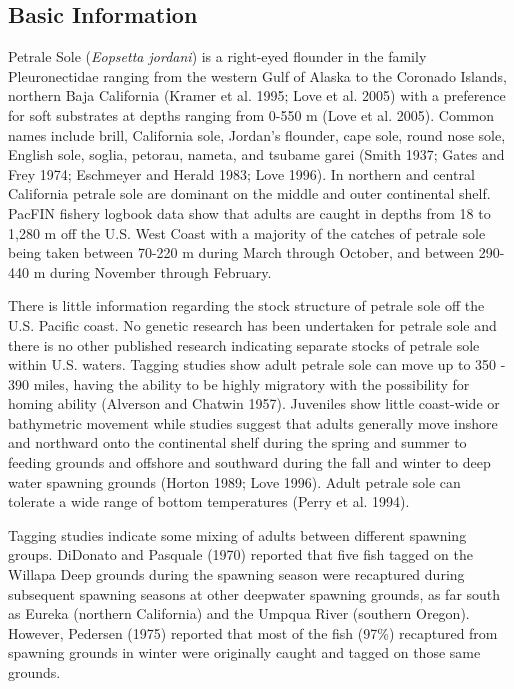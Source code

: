 \documentclass[11pt,
  english,
  letterpaper,
]{article}
\begin{document}
\hypertarget{basic-information}{%
\subsection{Basic Information}\label{basic-information}}

Petrale Sole (\emph{Eopsetta jordani}) is a right-eyed flounder in the family Pleuronectidae ranging from the western Gulf of Alaska to the Coronado Islands, northern Baja California (Kramer et al. 1995; Love et al. 2005) with a preference for soft substrates at depths ranging from 0-550 m (Love et al. 2005). Common names include brill, California sole, Jordan's flounder, cape sole, round nose sole, English sole, soglia, petorau, nameta, and tsubame garei (Smith 1937; Gates and Frey 1974; Eschmeyer and Herald 1983; Love 1996). In northern and central California petrale sole are dominant on the middle and outer continental shelf. PacFIN fishery logbook data show that adults are caught in depths from 18 to 1,280 m off the U.S. West Coast with a majority of the catches of petrale sole being taken between 70-220 m during March through October, and between 290-440 m during November through February.

There is little information regarding the stock structure of petrale sole off the U.S. Pacific coast. No genetic research has been undertaken for petrale sole and there is no other published research indicating separate stocks of petrale sole within U.S. waters. Tagging studies show adult petrale sole can move up to 350 - 390 miles, having the ability to be highly migratory with the possibility for homing ability (Alverson and Chatwin 1957). Juveniles show little coast-wide or bathymetric movement while studies suggest that adults generally move inshore and northward onto the continental shelf during the spring and summer to feeding grounds and offshore and southward during the fall and winter to deep water spawning grounds (Horton 1989; Love 1996). Adult petrale sole can tolerate a wide range of bottom temperatures (Perry et al. 1994).

Tagging studies indicate some mixing of adults between different spawning groups. DiDonato and Pasquale (1970) reported that five fish tagged on the Willapa Deep grounds during the spawning season were recaptured during subsequent spawning seasons at other deepwater spawning grounds, as far south as Eureka (northern California) and the Umpqua River (southern Oregon). However, Pedersen (1975) reported that most of the fish (97\%) recaptured from spawning grounds in winter were originally caught and tagged on those same grounds.
\end{document}
